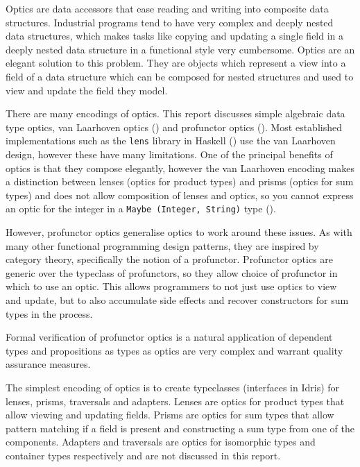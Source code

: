 \documentclass[11pt]{report}
\begin{document}
\begin{spacing}{1.15}
Optics are data accessors that ease reading and writing into composite data structures. Industrial programs tend to have very complex and deeply nested data structures, which makes tasks like copying and updating a single field in a deeply nested data structure in a functional style very cumbersome. Optics are an elegant solution to this problem. They are objects which represent a view into a field of a data structure which can be composed for nested structures and used to view and update the field they model.

There are many encodings of optics. This report discusses simple algebraic data type optics, van Laarhoven optics (\cite{laarhoven2011lens}) and profunctor optics (\cite{pickering2017profunctor}). Most established implementations such as the \texttt{lens} library in Haskell (\cite{ekmettlens}) use the van Laarhoven design, however these have many limitations. One of the principal benefits of optics is that they compose elegantly, however the van Laarhoven encoding makes a distinction between lenses (optics for product types) and prisms (optics for sum types) and does not allow composition of lenses and optics, so you cannot express an optic for the integer in a \texttt{Maybe (Integer, String)} type (\cite{pickering2017profunctor}).

However, profunctor optics generalise optics to work around these issues. As with many other functional programming design patterns, they are inspired by category theory, specifically the notion of a profunctor. Profunctor optics are generic over the typeclass of profunctors, so they allow choice of profunctor in which to use an optic. This allows programmers to not just use optics to view and update, but to also accumulate side effects and recover constructors for sum types in the process.

Formal verification of profunctor optics is a natural application of dependent types and propositions as types as optics are very complex and warrant quality assurance measures.

The simplest encoding of optics is to create typeclasses (interfaces in Idris) for lenses, prisms, traversals and adapters. Lenses are optics for product types that allow viewing and updating fields. Prisms are optics for sum types that allow pattern matching if a field is present and constructing a sum type from one of the components. Adapters and traversals are optics for isomorphic types and container types respectively and are not discussed in this report.


\end{spacing}
\end{document}
